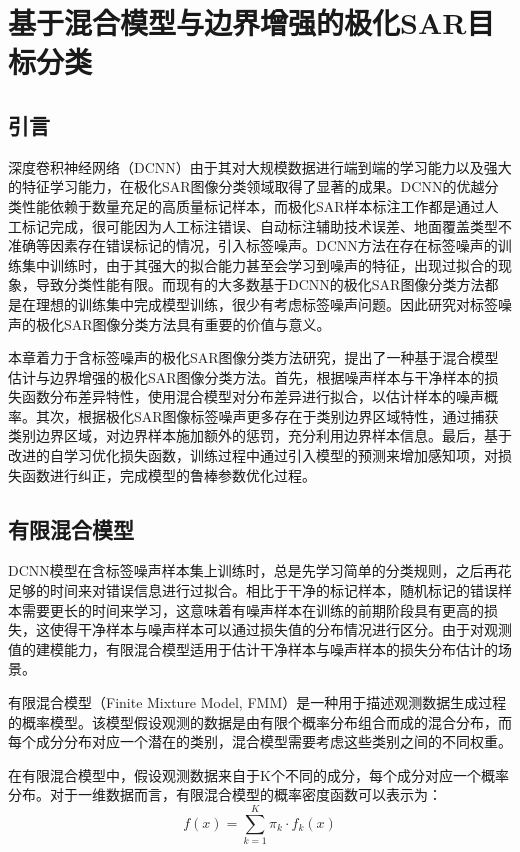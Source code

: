\chapter{基于混合模型与边界增强的极化SAR目标分类}
\section{引言}
深度卷积神经网络（DCNN）由于其对大规模数据进行端到端的学习能力以及强大的特征学习能力，在极化SAR图像分类领域取得了显著的成果。DCNN的优越分类性能依赖于数量充足的高质量标记样本，而极化SAR样本标注工作都是通过人工标记完成，很可能因为人工标注错误、自动标注辅助技术误差、地面覆盖类型不准确等因素存在错误标记的情况，引入标签噪声。DCNN方法在存在标签噪声的训练集中训练时，由于其强大的拟合能力甚至会学习到噪声的特征，出现过拟合的现象，导致分类性能有限。而现有的大多数基于DCNN的极化SAR图像分类方法都是在理想的训练集中完成模型训练，很少有考虑标签噪声问题。因此研究对标签噪声的极化SAR图像分类方法具有重要的价值与意义。

本章着力于含标签噪声的极化SAR图像分类方法研究，提出了一种基于混合模型估计与边界增强的极化SAR图像分类方法。首先，根据噪声样本与干净样本的损失函数分布差异特性，使用混合模型对分布差异进行拟合，以估计样本的噪声概率。其次，根据极化SAR图像标签噪声更多存在于类别边界区域特性，通过捕获类别边界区域，对边界样本施加额外的惩罚，充分利用边界样本信息。最后，基于改进的自学习优化损失函数，训练过程中通过引入模型的预测来增加感知项，对损失函数进行纠正，完成模型的鲁棒参数优化过程。

\section{有限混合模型}
DCNN模型在含标签噪声样本集上训练时，总是先学习简单的分类规则，之后再花足够的时间来对错误信息进行过拟合。相比于干净的标记样本，随机标记的错误样本需要更长的时间来学习，这意味着有噪声样本在训练的前期阶段具有更高的损失，这使得干净样本与噪声样本可以通过损失值的分布情况进行区分。由于对观测值的建模能力，有限混合模型适用于估计干净样本与噪声样本的损失分布估计的场景。

有限混合模型（Finite Mixture Model, FMM）是一种用于描述观测数据生成过程的概率模型。该模型假设观测的数据是由有限个概率分布组合而成的混合分布，而每个成分分布对应一个潜在的类别，混合模型需要考虑这些类别之间的不同权重。

在有限混合模型中，假设观测数据来自于K个不同的成分，每个成分对应一个概率分布。对于一维数据而言，有限混合模型的概率密度函数可以表示为：
\begin{equation}
  f(x)=\sum_{k=1}^{K}\pi_k \cdot f_k(x)
\end{equation}

